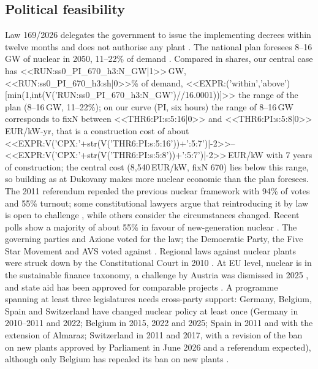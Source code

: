 \subsection{Political feasibility}
Law 169/2026 delegates the government to issue the implementing decrees within twelve months and does not authorise any plant \citep{Law2026}. The national plan foresees 8--16\,GW of nuclear in 2050, 11--22\% of demand \citep{PNIEC2024}. Compared in shares, our central case has <<RUN:ss0_PI_670_h3:N_GW|1>>\,GW, <<RUN:ss0_PI_670_h3:sh|0>>\% of demand, <<EXPR:('within','above')[min(1,int(V('RUN:ss0_PI_670_h3:N_GW')//16.0001))]>> the range of the plan (8--16\,GW, 11--22\%); on our curve (PI, six hours) the range of 8--16\,GW corresponds to fixN between <<THR6:PI:s:5:16|0>> and <<THR6:PI:s:5:8|0>>\,EUR/kW-yr, that is a construction cost of about <<EXPR:V('CPX:'+str(V('THR6:PI:s:5:16'))+':5:7')|-2>>--<<EXPR:V('CPX:'+str(V('THR6:PI:s:5:8'))+':5:7')|-2>>\,EUR/kW with 7 years of construction; the central cost (8{,}540\,EUR/kW, fixN 670) lies below this range, so building as at Dukovany makes more nuclear economic than the plan foresees. The 2011 referendum repealed the previous nuclear framework with 94\% of votes and 55\% turnout; some constitutional lawyers argue that reintroducing it by law is open to challenge \citep{Cabiddu2026}, while others consider the circumstances changed. Recent polls show a majority of about 55\% in favour of new-generation nuclear \citep{Euromedia2026}. The governing parties and Azione voted for the law; the Democratic Party, the Five Star Movement and AVS voted against \citep{Parties2026}. Regional laws against nuclear plants were struck down by the Constitutional Court in 2010 \citep{Consulta2010}. At EU level, nuclear is in the sustainable finance taxonomy, a challenge by Austria was dismissed in 2025 \citep{Taxonomy2025}, and state aid has been approved for comparable projects \citep{WNN2024}. A programme spanning at least three legislatures needs cross-party support: Germany, Belgium, Spain and Switzerland have changed nuclear policy at least once (Germany in 2010--2011 and 2022; Belgium in 2015, 2022 and 2025; Spain in 2011 and with the extension of Almaraz; Switzerland in 2011 and 2017, with a revision of the ban on new plants approved by Parliament in June 2026 and a referendum expected), although only Belgium has repealed its ban on new plants \citep{WNAcountries}.

